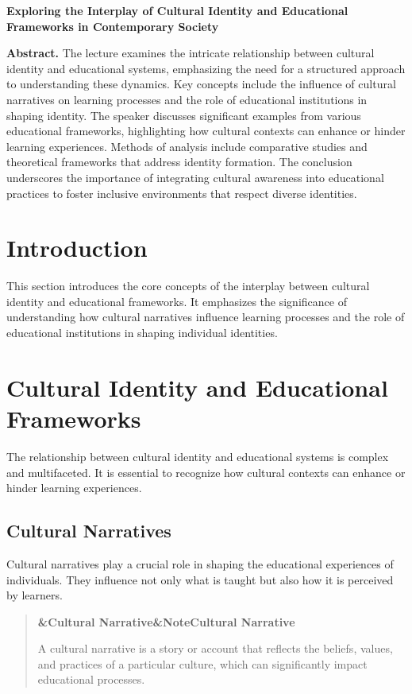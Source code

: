 \documentclass[a4paper]{article}
\newcommand{\boxheading}[1]{%
  \par\smallskip
  \noindent\textbf{\ifx&#1&Note\else#1\fi}\par
  \smallskip
}
\newenvironment{defbox}[1][]{%
  \begin{quote}\color{green!40!black}\boxheading{#1}\normalcolor
}{\end{quote}}
\begin{document}
\begin{center}
{\LARGE \textbf{Exploring the Interplay of Cultural Identity and Educational Frameworks in Contemporary Society}}\\[1em]
\end{center}

\textbf{Abstract.} The lecture examines the intricate relationship between cultural identity and educational systems, emphasizing the need for a structured approach to understanding these dynamics. Key concepts include the influence of cultural narratives on learning processes and the role of educational institutions in shaping identity. The speaker discusses significant examples from various educational frameworks, highlighting how cultural contexts can enhance or hinder learning experiences. Methods of analysis include comparative studies and theoretical frameworks that address identity formation. The conclusion underscores the importance of integrating cultural awareness into educational practices to foster inclusive environments that respect diverse identities.

\section{Introduction}
This section introduces the core concepts of the interplay between cultural identity and educational frameworks. It emphasizes the significance of understanding how cultural narratives influence learning processes and the role of educational institutions in shaping individual identities.

\section{Cultural Identity and Educational Frameworks}
The relationship between cultural identity and educational systems is complex and multifaceted. It is essential to recognize how cultural contexts can enhance or hinder learning experiences.

\subsection{Cultural Narratives}
Cultural narratives play a crucial role in shaping the educational experiences of individuals. They influence not only what is taught but also how it is perceived by learners.

\begin{defbox}[Cultural Narrative]
A cultural narrative is a story or account that reflects the beliefs, values, and practices of a particular culture, which can significantly impact educational processes.
\end{defbox}
\end{document}
